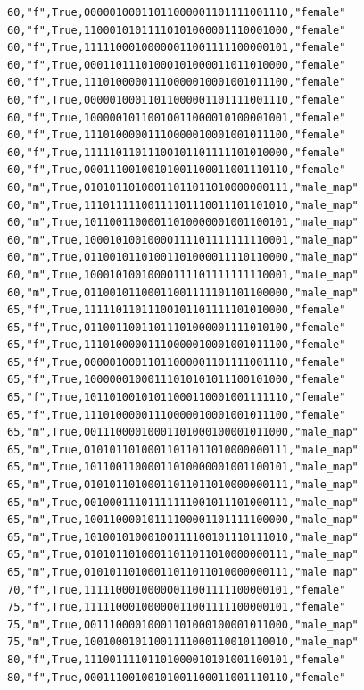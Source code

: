 \documentclass[authoryearcitations]{UoYCSproject}
\begin{document}
\begin{framed}
\begin{verbatim}
60,"f",True,00000100011011000001101111001110,"female"
60,"f",True,11000101011110101000001110001000,"female"
60,"f",True,11111000100000011001111100000101,"female"
60,"f",True,00011011101000101000011011010000,"female"
60,"f",True,11101000001110000010001001011100,"female"
60,"f",True,00000100011011000001101111001110,"female"
60,"f",True,10000010110010011000010100001001,"female"
60,"f",True,11101000001110000010001001011100,"female"
60,"f",True,11111011011100101101111101010000,"female"
60,"f",True,00011100100101001100011001110110,"female"
60,"m",True,01010110100011011011010000000111,"male_map"
60,"m",True,11101111100111101110011101101010,"male_map"
60,"m",True,10110011000011010000001001100101,"male_map"
60,"m",True,10001010010000111101111111110001,"male_map"
60,"m",True,01100101101001101000011110110000,"male_map"
60,"m",True,10001010010000111101111111110001,"male_map"
60,"m",True,01100101100011001111101101100000,"male_map"
65,"f",True,11111011011100101101111101010000,"female"
65,"f",True,01100110011011101000001111010100,"female"
65,"f",True,11101000001110000010001001011100,"female"
65,"f",True,00000100011011000001101111001110,"female"
65,"f",True,10000001000111010101011100101000,"female"
65,"f",True,10110100101011000110001001111110,"female"
65,"f",True,11101000001110000010001001011100,"female"
65,"m",True,00111000010001101000100001011000,"male_map"
65,"m",True,01010110100011011011010000000111,"male_map"
65,"m",True,10110011000011010000001001100101,"male_map"
65,"m",True,01010110100011011011010000000111,"male_map"
65,"m",True,00100011101111111001011101000111,"male_map"
65,"m",True,10011000010111100001101111100000,"male_map"
65,"m",True,10100101000100111100101110111010,"male_map"
65,"m",True,01010110100011011011010000000111,"male_map"
65,"m",True,01010110100011011011010000000111,"male_map"
70,"f",True,11111000100000011001111100000101,"female"
75,"f",True,11111000100000011001111100000101,"female"
75,"m",True,00111000010001101000100001011000,"male_map"
75,"m",True,10010001011001111000110010110010,"male_map"
80,"f",True,11100111101101000010101001100101,"female"
80,"f",True,00011100100101001100011001110110,"female"
\end{verbatim}
\end{framed}
\end{document}
